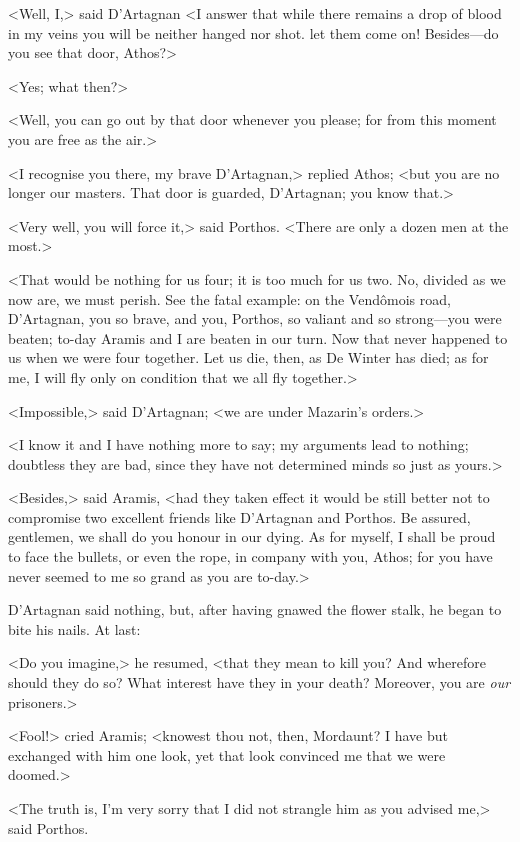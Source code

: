 <Well, I,> said D'Artagnan <I answer that while there remains a drop of blood in my veins you will be neither hanged nor shot.  let them come on! Besides—do you see that door, Athos?>

<Yes; what then?>

<Well, you can go out by that door whenever you please; for from this moment you are free as the air.>

<I recognise you there, my brave D'Artagnan,> replied Athos; <but you are no longer our masters. That door is guarded, D'Artagnan; you know that.>

<Very well, you will force it,> said Porthos. <There are only a dozen men at the most.>

<That would be nothing for us four; it is too much for us two. No, divided as we now are, we must perish. See the fatal example: on the Vendômois road, D'Artagnan, you so brave, and you, Porthos, so valiant and so strong—you were beaten; to-day Aramis and I are beaten in our turn. Now that never happened to us when we were four together. Let us die, then, as De Winter has died; as for me, I will fly only on condition that we all fly together.>

<Impossible,> said D'Artagnan; <we are under Mazarin's orders.>

<I know it and I have nothing more to say; my arguments lead to nothing; doubtless they are bad, since they have not determined minds so just as yours.>

<Besides,> said Aramis, <had they taken effect it would be still better not to compromise two excellent friends like D'Artagnan and Porthos. Be assured, gentlemen, we shall do you honour in our dying. As for myself, I shall be proud to face the bullets, or even the rope, in company with you, Athos; for you have never seemed to me so grand as you are to-day.>

D'Artagnan said nothing, but, after having gnawed the flower stalk, he began to bite his nails. At last:

<Do you imagine,> he resumed, <that they mean to kill you? And wherefore should they do so? What interest have they in your death? Moreover, you are \emph{our} prisoners.>

<Fool!> cried Aramis; <knowest thou not, then, Mordaunt? I have but exchanged with him one look, yet that look convinced me that we were doomed.>

<The truth is, I'm very sorry that I did not strangle him as you advised me,> said Porthos.

